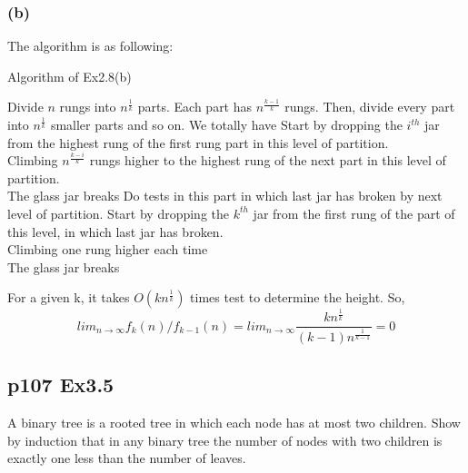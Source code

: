 \documentclass[a4paper]{article}
\begin{document}
\subsubsection*{(b)}
The algorithm is as following:
\begin{algorithm}[!htb]
	\caption{Algorithm of Ex2.8(b)}
	\begin{algorithmic}[1]
		\State Divide $n$ rungs into $n^{\frac{1}{k}}$ parts. Each part has $n^{\frac{k-1}{k}}$ rungs. Then, divide every part into $n^{\frac{1}{k}}$ smaller parts and so on. We totally have
		\State Start by dropping the $i^{th}$ jar from the highest rung of the first rung part in this level of partition.
		\Repeat \\
		\qquad Climbing $n^\frac{k-i}{k}$ rungs higher to the highest rung of the next part in this level of partition.
		\Until \\
		\qquad The glass jar breaks
		\State Do tests in this part in which last jar has broken by next level of partition.
		\EndFor
		\State Start by dropping the $k^{th}$ jar from the first rung of the part of this level, in which last jar has broken.
		\Repeat \\
		\quad Climbing one rung higher each time
		\Until\\
		\quad The glass jar breaks\\
	\end{algorithmic}
\end{algorithm}
\par For a given k, it takes $O(kn^{\frac{1}{k}})$ times test to determine the height. So,
$$lim_{n→∞} f_k(n)/f_{k−1}(n) = lim_{n→∞} \frac{kn^{\frac{1}{k}}}{(k-1)n^{\frac{1}{k-1}}} = 0 $$
\vspace{2cm}

\subsection*{p107 Ex3.5}
\begin{adjustwidth}{1cm}{1cm}
	A binary tree is a rooted tree in which each node has at most two children.
	Show by induction that in any binary tree the number of nodes with two
	children is exactly one less than the number of leaves.
\end{adjustwidth}
\end{document}
